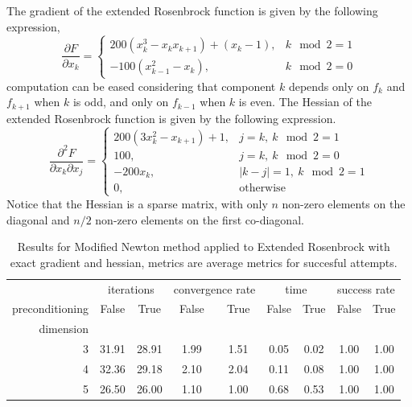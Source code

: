 The gradient of the extended Rosenbrock function is given by the following expression,
\begin{equation}
    \frac{\partial F}{\partial x_k} = 
    \left \{ \begin{array}{ll}
    200(x_k^3 - x_kx_{k+1}) + (x_k - 1), & k\mod 2 = 1\\
    -100(x_{k-1}^2 - x_k), & k\mod 2 = 0
    \end{array} \right .
\end{equation}
computation can be eased considering that component $k$ depends only on $f_k$ and $f_{k+1}$ when $k$ is odd, and only on $f_{k-1}$ when $k$ is even.
The Hessian of the extended Rosenbrock function is given by the following expression.
\begin{equation}
    \frac{\partial^2 F}{\partial x_k \partial x_j} = 
    \left \{ \begin{array}{ll}
    200(3x_k^2 - x_{k+1}) + 1, & j = k,\ k\mod 2 = 1\\
    100, & j = k,\ k\mod 2 = 0\\
    -200x_k, & \lvert k-j \rvert = 1,\ k\mod 2 = 1\\
    0, & \text{otherwise}
    \end{array} \right .
\end{equation}
Notice that the Hessian is a sparse matrix, with only $n$ non-zero elements on the diagonal and $n/2$ non-zero elements on the first co-diagonal.

\begin{table}
\centering
\caption{Results for Modified Newton method applied to Extended Rosenbrock with exact gradient and hessian, metrics are average metrics for succesful attempts.}
\label{tab:Modified_Newton_Extended_Rosenbrock_exact}
\begin{tabular}{r|cc|cc|cc|cc}
\toprule
    & \multicolumn{2}{|c}{iterations} & \multicolumn{2}{|c}{convergence rate} & \multicolumn{2}{|c}{time} & \multicolumn{2}{|c}{success rate} \\
preconditioning & False & True & False & True & False & True & False & True \\
dimension &  &  &  &  &  &  &  &  \\
\midrule
3 & 31.91 & 28.91 & 1.99 & 1.51 & 0.05 & 0.02 & 1.00 & 1.00 \\
4 & 32.36 & 29.18 & 2.10 & 2.04 & 0.11 & 0.08 & 1.00 & 1.00 \\
5 & 26.50 & 26.00 & 1.10 & 1.00 & 0.68 & 0.53 & 1.00 & 1.00 \\
\bottomrule
\end{tabular}
\end{table}

